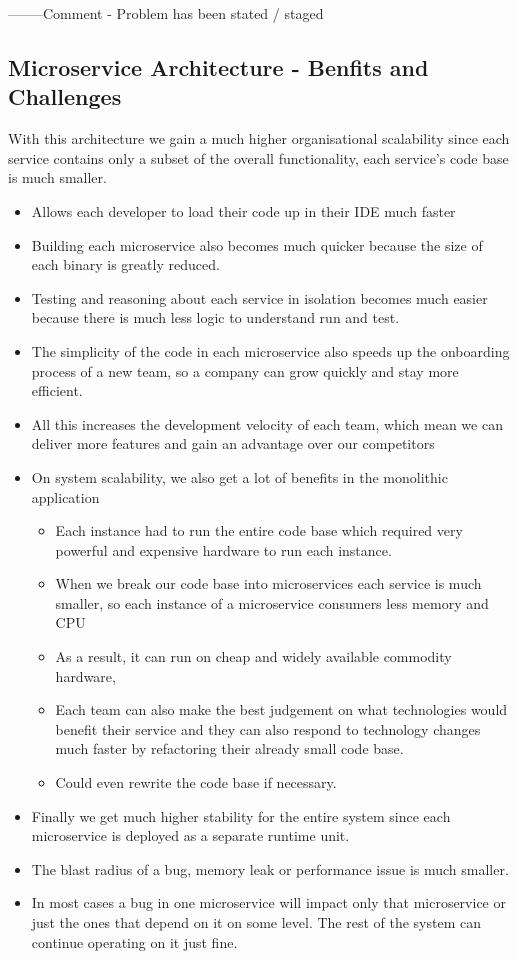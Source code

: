 \documentclass[a4paper, 11pt]{book}
\begin{document}
    --------Comment - Problem has been stated / staged

    \subsection{Microservice Architecture - Benfits and Challenges}
    With this architecture we gain a much higher organisational scalability since each service contains only a subset of the overall functionality, each service's code base is much smaller.
    \begin{itemize}
    \item Allows each developer to load their code up in their IDE much faster
    \item Building each microservice also becomes much quicker because the size of each binary is greatly reduced.
    \item Testing and reasoning about each service in isolation becomes much easier because there is much less logic to understand run and test.
    \item The simplicity of the code in each microservice also speeds up the onboarding process of a new team, so a company can grow quickly and stay more efficient.
    \item All this increases the development velocity of each team, which mean we can deliver more features and gain an advantage over our competitors
    \item On system scalability, we also get a lot of benefits in the monolithic application
    \begin{itemize}
    \item Each instance had to run the entire code base which required very powerful and expensive hardware to run each instance.
    \item When we break our code base into microservices each service is much smaller, so each instance of a microservice consumers less memory and CPU
    \item As a result, it can run on cheap and widely available commodity hardware,
    \item Each team can also make the best judgement on what technologies would benefit their service and they can also respond to technology changes much faster by refactoring their already small code base.
    \item Could even rewrite the code base if necessary.
    \end{itemize}
    \item Finally we get much higher stability for the entire system since each microservice is deployed as a separate runtime unit.
    \item The blast radius of a bug, memory leak or performance issue is much smaller.
    \item In most cases a bug in one microservice will impact only that microservice or just the ones that depend on it on some level. The rest of the system can continue operating on it just fine.
    \end{itemize}
\end{document}
